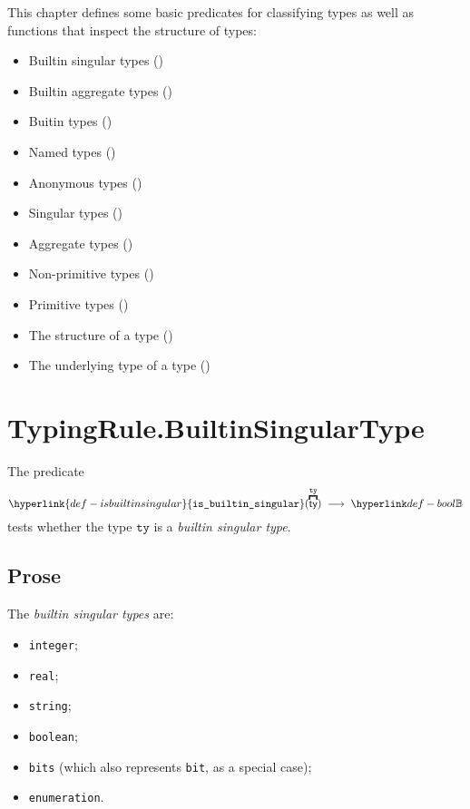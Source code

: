 \documentclass{book}
\newcommand\isbuiltinsingular[0]{\hyperlink{def-isbuiltinsingular}{\texttt{is\_builtin\_singular}}}
\newcommand\tty[0]{\texttt{ty}}
\begin{document}
This chapter defines some basic predicates for classifying types as well as
functions that inspect the structure of types:
\begin{itemize}
  \item Builtin singular types ()
  \item Builtin aggregate types ()
  \item Buitin types ()
  \item Named types ()
  \item Anonymous types ()
  \item Singular types ()
  \item Aggregate types ()
  \item Non-primitive types ()
  \item Primitive types ()
  \item The structure of a type ()
  \item The underlying type of a type ()
\end{itemize}

\section{TypingRule.BuiltinSingularType \label{sec:TypingRule.BuiltinSingularType}}
\hypertarget{def-isbuiltinsingular}{}
The predicate
\[
  \isbuiltinsingular(\overname{\ty}{\tty}) \;\aslto\; \Bool
\]
tests whether the type $\tty$ is a \emph{builtin singular type}.

\subsection{Prose}
The \emph{builtin singular types} are:
\begin{itemize}
\item \texttt{integer};
\item \texttt{real};
\item \texttt{string};
\item \texttt{boolean};
\item \texttt{bits} (which also represents \texttt{bit}, as a special case);
\item \texttt{enumeration}.
\end{itemize}
\end{document}
